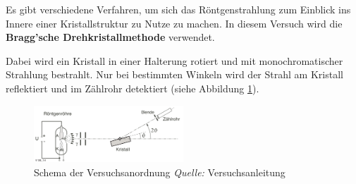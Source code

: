 Es gibt  verschiedene Verfahren, um  sich das R\"ontgenstrahlung  zum Einblick
ins Innere einer  Kristallstruktur zu Nutze zu machen. In  diesem Versuch wird
die \textbf{Bragg'sche Drehkristallmethode} verwendet.

Dabei wird ein  Kristall in einer Halterung rotiert  und mit monochromatischer
Strahlung   bestrahlt. Nur  bei   bestimmten  Winkeln   wird  der   Strahl  am
Kristall   reflektiert  und   im   Z\"ahlrohr   detektiert  (siehe   Abbildung
\ref{fig:braggDrehkristall}).

\begin{figure}[h!]
    \centering
    \includegraphics[width=0.5\textwidth]{images/bragg-drehkristall.png}
    \caption{%
        Schema der Versuchsanordnung
        \emph{Quelle:} Versuchsanleitung
    }
    \label{fig:braggDrehkristall}
\end{figure}

